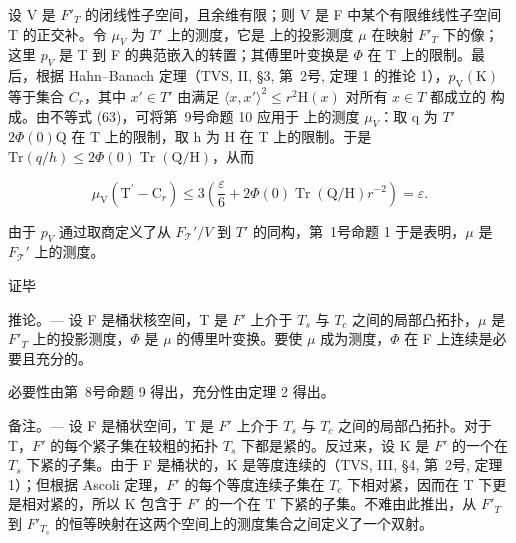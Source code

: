 设 V 是 \(F'_{T}\) 的闭线性子空间，且余维有限；则 V 是 F 中某个有限维线性子空间 T 的正交补。令 \(\mu_{V}\) 为 \(T'\) 上的测度，它是  上的投影测度 \(\mu\) 在映射 \(F'_{T}\) 下的像；这里 \(p_{V}\) 是 T 到 F 的典范嵌入的转置；其傅里叶变换是 \(\Phi\) 在 T 上的限制。最后，根据 Hahn--Banach 定理（TVS, II, §3, 第~2号, 定理 1 的推论 1），\(p_{\mathrm{V}}(\mathrm{K})\) 等于集合 \(C_{r}\)，其中 \(x' \in T'\) 由满足 \(\langle x, x' \rangle^{2} \leqslant r^{2}\mathrm{H}(x)\) 对所有 \(x \in T\) 都成立的  构成。由不等式 (63)，可将第~9号命题 10 应用于  上的测度 \(\mu_{V}\)：取 q 为 \(T'\)\(2\Phi(0)\mathrm{Q}\) 在 T 上的限制，取 h 为 H 在 T 上的限制。于是 \(\mathrm{Tr}(q/h) \leqslant 2\Phi(0)\operatorname{Tr}(\mathrm{Q}/\mathrm{H})\)，从而

\[
\mu_ {\mathrm{V}} \left(\mathrm{T} ^ {\prime} - \mathrm{C} _ {r}\right) \leqslant 3 \left(\frac {\varepsilon}{6} + 2 \Phi (0) \operatorname{Tr} (\mathrm{Q} / \mathrm{H}) r ^ {- 2}\right) = \varepsilon .
\]

由于 \(p_V\) 通过取商定义了从 \(F_{\mathcal{T}}' / V\) 到 \(T'\) 的同构，第~1号命题 1 于是表明，\(\mu\) 是 \(F_{\mathcal{T}}'\) 上的测度。

证毕

推论。--- 设 F 是桶状核空间，T 是 \(F'\) 上介于 \(T_{s}\) 与 \(T_{c}\) 之间的局部凸拓扑，\(\mu\) 是 \(F'_{T}\) 上的投影测度，\(\Phi\) 是 \(\mu\) 的傅里叶变换。要使 \(\mu\) 成为测度，\(\Phi\) 在 F 上连续是必要且充分的。

必要性由第~8号命题 9 得出，充分性由定理 2 得出。

备注。--- 设 F 是桶状空间，T 是 \(F'\) 上介于 \(T_s\) 与 \(T_c\) 之间的局部凸拓扑。对于 T，\(F'\) 的每个紧子集在较粗的拓扑 \(T_s\) 下都是紧的。反过来，设 K 是 \(F'\) 的一个在 \(T_s\) 下紧的子集。由于 F 是桶状的，K 是等度连续的（TVS, III, §4, 第~2号, 定理 1）；但根据 Ascoli 定理，\(F'\) 的每个等度连续子集在 \(T_c\) 下相对紧，因而在 T 下更是相对紧的，所以 K 包含于 \(F'\) 的一个在 T 下紧的子集。不难由此推出，从 \(F'_T\) 到 \(F'_{T_s}\) 的恒等映射在这两个空间上的测度集合之间定义了一个双射。


